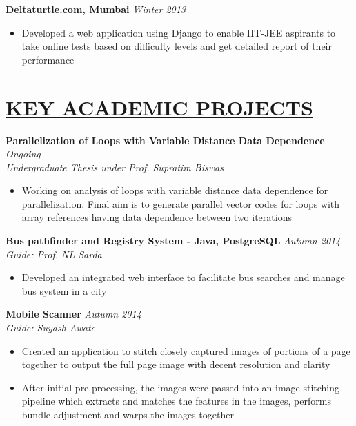 \documentclass[11pt]{res}
\begin{document}
\begin{resume}
\vspace{-10pt}
\textbf{Deltaturtle.com, Mumbai} \hfill \emph{Winter 2013}
 \begin{itemize} \itemsep -2pt
\item Developed a web application using Django to enable IIT-JEE aspirants to take online tests based on difficulty levels and get detailed report of their performance 

\end{itemize} 

\vspace{-10pt}
\section{\underline{KEY ACADEMIC PROJECTS}} 
\vspace{3pt}

\textbf{Parallelization of Loops with Variable Distance Data Dependence} \hfill \emph{Ongoing}\\
\textsl{Undergraduate Thesis under Prof. Supratim Biswas}\hfill
\begin{itemize} \itemsep -2pt
\item Working on analysis of loops with variable distance data dependence for parallelization. Final aim is to generate parallel vector codes for loops with array references having data dependence between two iterations 
\end{itemize}

\vspace{-10pt}
\textbf{Bus pathfinder and Registry System - Java, PostgreSQL} \hfill \emph{Autumn 2014}\\
\textsl{Guide: Prof. NL Sarda}\hfill  
\begin{itemize} \itemsep -2pt
\item Developed an integrated web interface to facilitate bus searches and manage bus system in a city
\end{itemize}

\vspace{-10pt}
\textbf{Mobile Scanner} \hfill \emph{Autumn 2014}\\
\textsl{Guide: Suyash Awate}\hfill
\begin{itemize} \itemsep -2pt
\item Created an application to stitch closely captured images of portions of a page together to output the full page image with decent resolution and clarity
\item After initial pre-processing, the images were passed into an image-stitching pipeline which extracts and matches the features in the images, performs bundle adjustment and warps the images together 
\end{itemize}


\end{resume}
\end{document}
